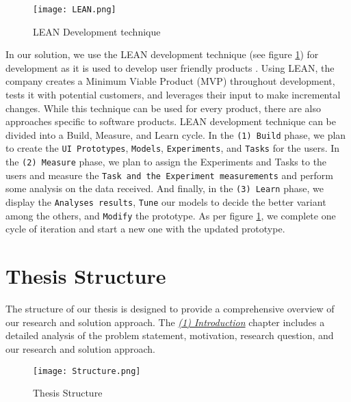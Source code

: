 \begin{figure}[ht]
    \centering
    \texttt{[image: LEAN.png]}
    \caption{LEAN Development technique}
    \label{intro:fig:lean}
\end{figure}

In our solution, we use the LEAN development technique (see figure \ref{intro:fig:lean}) for development as it is used to develop user friendly products \cite{article:lean:hart}.
Using LEAN, the company creates a Minimum Viable Product (MVP) throughout development, tests it with potential customers, and leverages their input to make incremental changes.
While this technique can be used for every product, there are also approaches specific to software products.
LEAN development technique can be divided into a Build, Measure, and Learn cycle. 
In the \texttt{(1) Build} phase, we plan to create the \texttt{UI Prototypes}, \texttt{Models}, \texttt{Experiments}, and \texttt{Tasks} for the users.
In the \texttt{(2) Measure} phase, we plan to assign the Experiments and Tasks to the users and measure the \texttt{Task and the Experiment measurements} and perform some analysis on the data received. 
And finally, in the \texttt{(3) Learn} phase, we display the \texttt{Analyses results}, \texttt{Tune} our models to decide the better variant among the others, and \texttt{Modify} the prototype.
As per figure \ref{intro:fig:lean}, we complete one cycle of iteration and start a new one with the updated prototype.

\clearpage

\section{Thesis Structure}
The structure of our thesis is designed to provide a comprehensive overview of our research and solution approach.
The \textit{\hyperref[chap:introduction]{(1) Introduction}} chapter includes a detailed analysis of the problem statement, motivation, research question, and our research and solution approach.

\begin{figure}[htbp!]
    \centering
    \texttt{[image: Structure.png]}
    \caption{Thesis Structure}
    \label{intro:fig:structure}
\end{figure}

